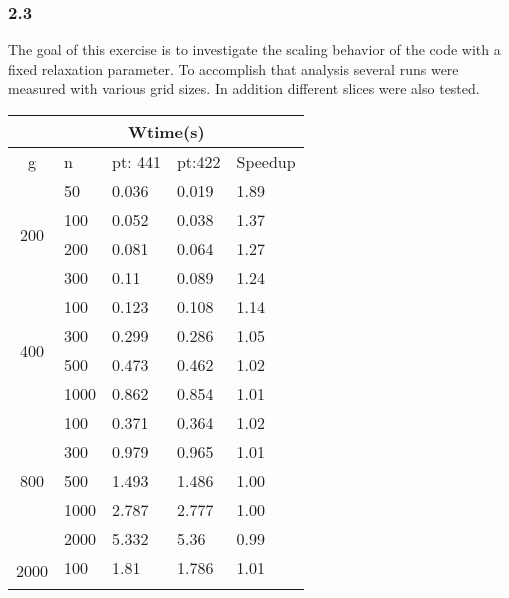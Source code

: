 \subsubsection*{2.3}
The goal of this exercise is to investigate the scaling behavior of the code with a fixed relaxation parameter. To accomplish that analysis several runs were measured with various grid sizes. In addition different slices were also tested.
\begin{table*}[]
\centering
\begin{tabular}{@{}cllll@{}}
\toprule
                      &      & \multicolumn{2}{c}{Wtime(s)} &         \\ \midrule
g                     & n    & pt: 441       & pt:422       & Speedup \\ \midrule
\multirow{4}{*}{200}  & 50   & 0.036         & 0.019        & 1.89    \\ \cmidrule(l){2-5} 
                      & 100  & 0.052         & 0.038        & 1.37    \\ \cmidrule(l){2-5} 
                      & 200  & 0.081         & 0.064        & 1.27    \\ \cmidrule(l){2-5} 
                      & 300  & 0.11          & 0.089        & 1.24    \\ \midrule
\multirow{4}{*}{400}  & 100  & 0.123         & 0.108        & 1.14    \\ \cmidrule(l){2-5} 
                      & 300  & 0.299         & 0.286        & 1.05    \\ \cmidrule(l){2-5} 
                      & 500  & 0.473         & 0.462        & 1.02    \\ \cmidrule(l){2-5} 
                      & 1000 & 0.862         & 0.854        & 1.01    \\ \midrule
\multirow{5}{*}{800}  & 100  & 0.371         & 0.364        & 1.02    \\ \cmidrule(l){2-5} 
                      & 300  & 0.979         & 0.965        & 1.01    \\ \cmidrule(l){2-5} 
                      & 500  & 1.493         & 1.486        & 1.00    \\ \cmidrule(l){2-5} 
                      & 1000 & 2.787         & 2.777        & 1.00    \\ \cmidrule(l){2-5} 
                      & 2000 & 5.332         & 5.36         & 0.99    \\ \midrule
\multirow{5}{*}{2000} & 100  & 1.81          & 1.786        & 1.01    \\ \cmidrule(l){2-5} 

\end{tabular}
\end{table*}

